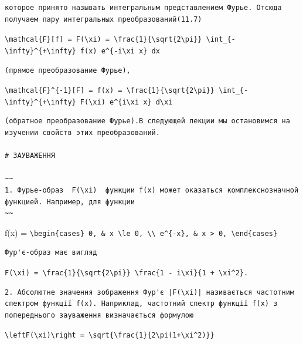 \documentclass[
  ukrainian,
]{article}
\begin{document}
\begin{verbatim}
которое принято называть интегральным представлением Фурье. Отсюда получаем пару интегральных преобразований(11.7)
\end{verbatim}

\texttt{\textbackslash{}mathcal\{F\}{[}f{]}\ =\ F(\textbackslash{}xi)\ =\ \textbackslash{}frac\{1\}\{\textbackslash{}sqrt\{2\textbackslash{}pi\}\}\ \textbackslash{}int\_\{-\textbackslash{}infty\}\^{}\{+\textbackslash{}infty\}\ f(x)\ e\^{}\{-i\textbackslash{}xi\ x\}\ dx}

\begin{verbatim}
(прямое преобразование Фурье),
\end{verbatim}

\texttt{\textbackslash{}mathcal\{F\}\^{}\{-1\}{[}F{]}\ =\ f(x)\ =\ \textbackslash{}frac\{1\}\{\textbackslash{}sqrt\{2\textbackslash{}pi\}\}\ \textbackslash{}int\_\{-\textbackslash{}infty\}\^{}\{+\textbackslash{}infty\}\ F(\textbackslash{}xi)\ e\^{}\{i\textbackslash{}xi\ x\}\ d\textbackslash{}xi}

\begin{verbatim}
(обратное преобразование Фурье).В следующей лекции мы остановимся на изучении свойств этих преобразований.

# ЗАУВАЖЕННЯ

~~
1. Фурье-образ  F(\xi)  функции f(x) может оказаться комплекснозначной функцией. Например, для функции
~~
\end{verbatim}

f(x) =
\texttt{\textbackslash{}begin\{cases\}\ 0,\ \&\ x\ \textbackslash{}le\ 0,\ \textbackslash{}\textbackslash{}\ e\^{}\{-x\},\ \&\ x\ \textgreater{}\ 0,\ \textbackslash{}end\{cases\}}

\begin{verbatim}
Фур'є-образ має вигляд
\end{verbatim}

\texttt{F(\textbackslash{}xi)\ =\ \textbackslash{}frac\{1\}\{\textbackslash{}sqrt\{2\textbackslash{}pi\}\}\ \textbackslash{}frac\{1\ -\ i\textbackslash{}xi\}\{1\ +\ \textbackslash{}xi\^{}2\}.}

\begin{verbatim}
2. Абсолютне значення зображення Фур'є |F(\xi)| називається частотним спектром функції f(x). Наприклад, частотний спектр функції f(x) з попереднього зауваження визначається формулою
\end{verbatim}

\texttt{\textbackslash{}left\textbar{}F(\textbackslash{}xi)\textbackslash{}right\textbar{}\ =\ \textbackslash{}sqrt\{\textbackslash{}frac\{1\}\{2\textbackslash{}pi(1+\textbackslash{}xi\^{}2)\}\}}
\end{document}
